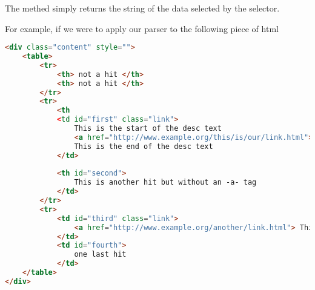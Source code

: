 The  methed simply returns the string of the data selected by the selector.

For example, if we were to apply our parser to the following piece of html

\begin{lstlisting}[language=HTML]
<div class="content" style="">
	<table>
		<tr>
			<th> not a hit </th>
			<th> not a hit </th>
		</tr>
		<tr>
			<th
			<td id="first" class="link">
				This is the start of the desc text
				<a href="http://www.example.org/this/is/our/link.html"> This is our link text</a>
				This is the end of the desc text
			</td>
		
			<th id="second">
				This is another hit but without an -a- tag
			</td>
		</tr>
		<tr>
			<td id="third" class="link">
				<a href="http://www.example.org/another/link.html"> This is our link text</a>
			</td>
			<td id="fourth">
				one last hit
			</td>
	</table>
</div>
\end{lstlisting}

